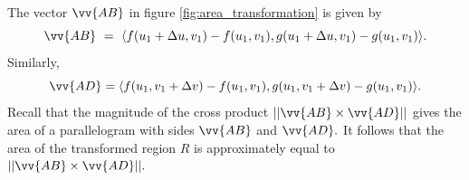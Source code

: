 The vector $\vv{AB}$ in figure \ref{fig:area_transformation} is given by \[\vv{AB}~=~\langle f(u_1+\Delta u,v_1)-f(u_1,v_1),g(u_1+\Delta u,v_1)-g(u_1,v_1)\rangle.\]  Similarly, \[\vv{AD} = \langle f(u_1,v_1 + \Delta v) - f(u_1,v_1), g(u_1,v_1 + \Delta v) - g(u_1,v_1)\rangle.\]  Recall that the magnitude of the cross product $||\vv{AB} \times \vv{AD}||$ gives the area of a parallelogram with sides $\vv{AB}$ and $\vv{AD}.$  It follows that the area of the transformed region $R$ is approximately equal to $||\vv{AB} \times \vv{AD}||.$


